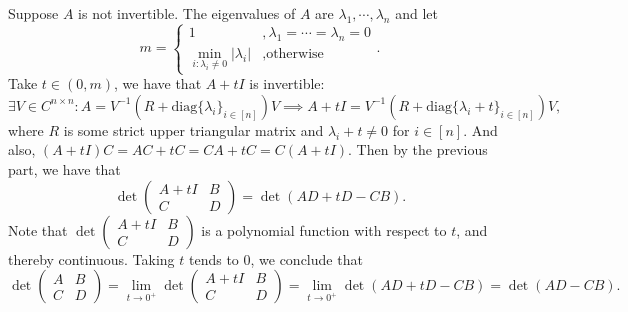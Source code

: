 \documentclass[11pt]{article}
\theoremstyle{plain}
\theoremstyle{definition}
\theoremstyle{remark}
\newcommand{\diag}{\mathrm{diag}}
\newcommand{\tuple}[1]{\left(#1\right)}
\newcommand{\tp}{\tuple}
\begin{document}
Suppose $A$ is not invertible.  
The eigenvalues of $A$ are $\lambda_1,\cdots,\lambda_n$ and let
$$
    m = \begin{cases}1 &,\lambda_1 = \cdots=\lambda_n=0 \\\min_{i:\lambda_i\neq 0}|\lambda_i| &,\text{otherwise} \end{cases} .
$$
Take $t\in (0,m)$, we have that $A + t I$ is invertible: 
$$
    \exists V\in C^{n\times n}: A=V^{-1}\tp{R+\diag\{\lambda_i\}_{i\in[n]}}V \implies A+tI = V^{-1}\tp{R+\diag\{\lambda_i+t\}_{i\in[n]}}V,
$$
where $R$ is some strict upper triangular matrix and $\lambda_i + t \neq 0$ for $i\in[n]$.
And also, $(A+tI)C = AC+tC=CA+tC=C(A+tI)$.
Then by the previous part, we have that 
$$
    \det\begin{pmatrix}
        A + tI & B
        \\ C & D
    \end{pmatrix} = \det(AD+tD-CB).
$$
Note that $\det\begin{pmatrix}
        A + tI & B
        \\ C & D
    \end{pmatrix}$ is a polynomial function with respect to $t$, and thereby continuous.
Taking $t$ tends to $0$, we conclude that
$$
    \det\begin{pmatrix}
        A & B
        \\ C & D
    \end{pmatrix} = \lim_{t\to 0^+}\det\begin{pmatrix}
        A+tI & B
        \\ C & D
    \end{pmatrix} = \lim_{t\to 0^+}\det(AD+tD-CB) = \det(AD-CB).
$$
\end{document}
